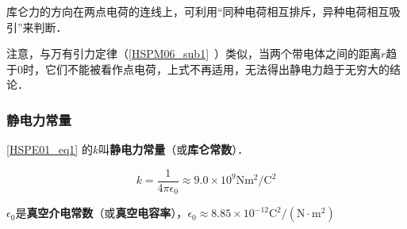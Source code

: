 库仑力的方向在两点电荷的连线上，可利用“同种电荷相互排斥，异种电荷相互吸引”来判断．

注意，与万有引力定律（\autoref{HSPM06_sub1}~）类似，当两个带电体之间的距离$r$趋于$0$时，它们不能被看作点电荷，上式不再适用，无法得出静电力趋于无穷大的结论．

\subsubsection{静电力常量}

\autoref{HSPE01_eq1} 的$k$叫\textbf{静电力常量}（或\textbf{库仑常数}）．

\begin{equation}
k = \frac{1}{4\pi\epsilon_0} \approx 9.0 \times 10^{9} \mathrm{N m^2/C^2}
\end{equation}

$\epsilon_0$是\textbf{真空介电常数}（或\textbf{真空电容率}），$\epsilon_0 \approx 8.85 \times 10^{-12} \mathrm{C^2/(N \cdot m^2)}$
